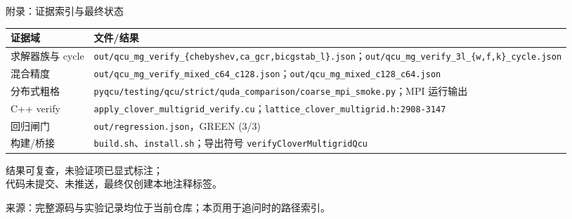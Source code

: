 \documentclass[UTF8,aspectratio=169,11pt]{ctexbeamer}
\newcommand{\source}[1]{%
  \vspace{0.06em}\par{\raggedright\scriptsize\color{muted}来源：#1\par}}
\newcommand{\code}[1]{\nolinkurl{#1}}
\begin{document}
\begin{frame}[t]{附录：证据索引与最终状态}
  \begin{center}
    \small
    \renewcommand{\arraystretch}{0.82}
    \begin{tabular}{@{}P{0.34\textwidth}P{0.50\textwidth}@{}}
      \toprule
      证据域 & 文件/结果 \\
      \midrule
      求解器族与 cycle & \code{out/qcu_mg_verify_{chebyshev,ca_gcr,bicgstab_l}.json}；\code{out/qcu_mg_verify_3l_{w,f,k}_cycle.json} \\
      混合精度 & \code{out/qcu_mg_verify_mixed_c64_c128.json}；\code{out/qcu_mg_mixed_c128_c64.json} \\
      分布式粗格 & \code{pyqcu/testing/qcu/strict/quda_comparison/coarse_mpi_smoke.py}；MPI 运行输出 \\
      C++ verify & \code{apply_clover_multigrid_verify.cu}；\code{lattice_clover_multigrid.h:2908-3147} \\
      回归闸门 & \code{out/regression.json}，GREEN (3/3) \\
      构建/桥接 & \code{build.sh}、\code{install.sh}；导出符号 \code{verifyCloverMultigridQcu} \\
      \bottomrule
    \end{tabular}
  \end{center}
  \vspace{-0.08em}
  \begin{center}
    \colorbox{good}{\parbox{0.80\textwidth}{\centering\small
      结果可复查，未验证项已显式标注；\\
      代码未提交、未推送，最终仅创建本地注释标签。}}
  \end{center}
  \source{完整源码与实验记录均位于当前仓库；本页用于追问时的路径索引。}
\end{frame}
\end{document}
